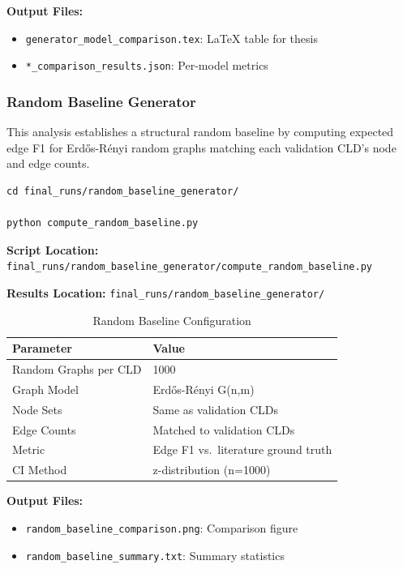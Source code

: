 \textbf{Output Files:}
\begin{itemize}[noitemsep]
    \item \texttt{generator\_model\_comparison.tex}: LaTeX table for thesis
    \item \texttt{*\_comparison\_results.json}: Per-model metrics
\end{itemize}

\subsubsection{Random Baseline Generator}
\label{sec:random_baseline}

This analysis establishes a structural random baseline by computing expected edge F1 for Erd\H{o}s-R\'enyi random graphs matching each validation CLD's node and edge counts.

\begin{verbatim}
cd final_runs/random_baseline_generator/

python compute_random_baseline.py
\end{verbatim}

\textbf{Script Location:} \texttt{final\_runs/random\_baseline\_generator/compute\_random\_baseline.py}

\textbf{Results Location:} \texttt{final\_runs/random\_baseline\_generator/}

\begin{table}[H]
\centering
\caption{Random Baseline Configuration}
\label{tab:random_baseline_config}
\footnotesize
\begin{tabular}{@{}ll@{}}
\toprule
\textbf{Parameter} & \textbf{Value} \\
\midrule
Random Graphs per CLD & 1000 \\
Graph Model & Erd\H{o}s-R\'enyi G(n,m) \\
Node Sets & Same as validation CLDs \\
Edge Counts & Matched to validation CLDs \\
Metric & Edge F1 vs.\ literature ground truth \\
CI Method & z-distribution (n=1000) \\
\bottomrule
\end{tabular}
\end{table}

\textbf{Output Files:}
\begin{itemize}[noitemsep]
    \item \texttt{random\_baseline\_comparison.png}: Comparison figure
    \item \texttt{random\_baseline\_summary.txt}: Summary statistics
\end{itemize}

